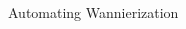 \documentclass[xcolor=table,aspectratio=169]{beamer}
\numberwithin{equation}{section}
\begin{document}
\begin{frame}{Automating Wannierization}
   \begin{columns}
      \begin{column}{0.6\textwidth}
         \inputminted[fontsize=\scriptsize]{json}{scripts/si.json}
      \end{column}
      \begin{column}{0.4\textwidth}
      \end{column}
   \end{columns}
\end{frame}
\end{document}
